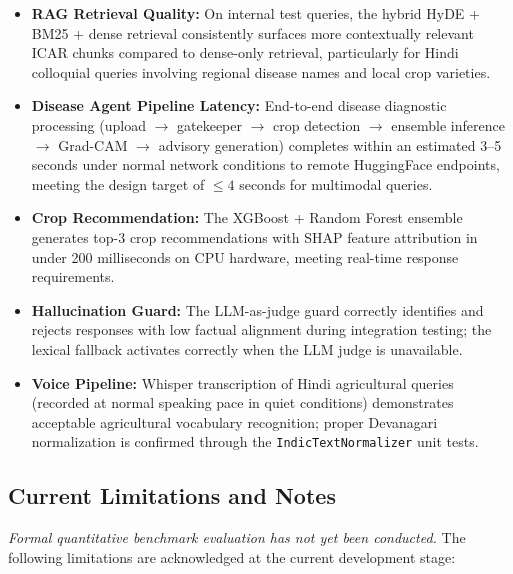 \documentclass[12pt,a4paper]{article}
\begin{document}
\begin{itemize}
\item \textbf{RAG Retrieval Quality:} On internal test queries, the hybrid HyDE + BM25 + dense retrieval consistently surfaces more contextually relevant ICAR chunks compared to dense-only retrieval, particularly for Hindi colloquial queries involving regional disease names and local crop varieties.

\item \textbf{Disease Agent Pipeline Latency:} End-to-end disease diagnostic processing (upload $\to$ gatekeeper $\to$ crop detection $\to$ ensemble inference $\to$ Grad-CAM $\to$ advisory generation) completes within an estimated 3--5 seconds under normal network conditions to remote HuggingFace endpoints, meeting the design target of $\leq 4$ seconds for multimodal queries.

\item \textbf{Crop Recommendation:} The XGBoost + Random Forest ensemble generates top-3 crop recommendations with SHAP feature attribution in under 200 milliseconds on CPU hardware, meeting real-time response requirements.

\item \textbf{Hallucination Guard:} The LLM-as-judge guard correctly identifies and rejects responses with low factual alignment during integration testing; the lexical fallback activates correctly when the LLM judge is unavailable.

\item \textbf{Voice Pipeline:} Whisper transcription of Hindi agricultural queries (recorded at normal speaking pace in quiet conditions) demonstrates acceptable agricultural vocabulary recognition; proper Devanagari normalization is confirmed through the \texttt{IndicTextNormalizer} unit tests.
\end{itemize}

\subsection{Current Limitations and Notes}
\enlargethispage{5\baselineskip}

\textit{Formal quantitative benchmark evaluation has not yet been conducted.} The following limitations are acknowledged at the current development stage:
\end{document}
